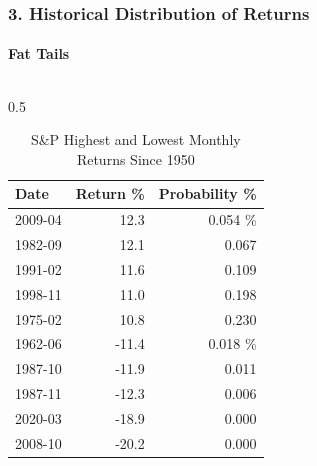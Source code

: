 \documentclass{beamer}
\begin{document}
\begin{frame}[t]
    \frametitle{3. Historical Distribution of Returns}
    \framesubtitle{Fat Tails}

    \vspace{-0.5em}

    \footnotesize
    \begin{columns}
        \begin{column}{0.5\textwidth}
                \begin{table}
                \caption{S\&P Highest and Lowest Monthly Returns Since 1950}
                \begin{tabular}{lrr}
                \toprule
                Date & Return \% & Probability \% \\
                \midrule
                 2009-04 & 12.3 & 0.054 \% \\
                1982-09 & 12.1 & 0.067 \\
                1991-02 & 11.6 & 0.109 \\
                1998-11 & 11.0 & 0.198 \\
                1975-02 & 10.8 & 0.230 \\
                \midrule
                1962-06 & -11.4 & 0.018 \% \\
                1987-10 & -11.9 & 0.011 \\
                1987-11 & -12.3 & 0.006 \\
                2020-03 & -18.9 & 0.000 \\
                2008-10 & -20.2 & 0.000 \\
                \bottomrule
                \end{tabular}
                \end{table}
        \end{column}


\end{columns}
\end{frame}
\end{document}
